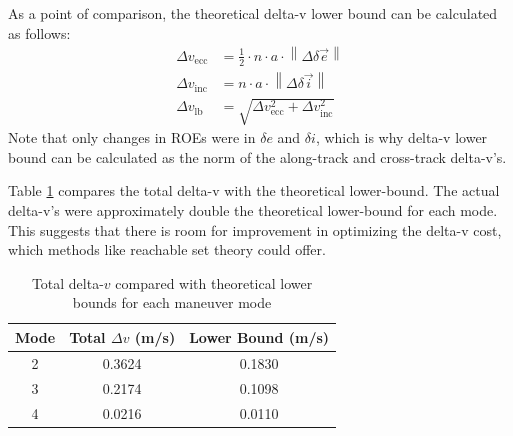 As a point of comparison, the theoretical delta-v lower bound can be calculated as follows:
\begin{align*}
\Delta v_{\text{ecc}} &= \frac{1}{2} \cdot n \cdot a \cdot \left\| \Delta \delta\vec{e} \right\| \\
\Delta v_{\text{inc}} &= n \cdot a \cdot \left\| \Delta \delta\vec{i} \right\| \\
\Delta v_{\text{lb}} &= \sqrt{\Delta v_{\text{ecc}}^2 + \Delta v_{\text{inc}}^2}
\end{align*}
Note that only changes in ROEs were in $\delta e$ and $\delta i$, which is why delta-v lower bound can be calculated as the norm of the along-track and cross-track delta-v's. 

Table \ref{tab:dv_comparison} compares the total delta-v with the theoretical lower-bound. The actual delta-v's were approximately double the theoretical lower-bound for each mode. This suggests that there is room for improvement in optimizing the delta-v cost, which methods like reachable set theory could offer. 
\begin{table}[h!]
\centering
\begin{tabular}{|c|c|c|}
\hline
\textbf{Mode} & \textbf{Total }$\Delta v$ \textbf{(m/s)} & \textbf{Lower Bound (m/s)} \\
\hline
2 & 0.3624 & 0.1830 \\
3 & 0.2174 & 0.1098 \\
4 & 0.0216 & 0.0110 \\
\hline
\end{tabular}
\caption{Total delta-$v$ compared with theoretical lower bounds for each maneuver mode}
\label{tab:dv_comparison}
\end{table}


